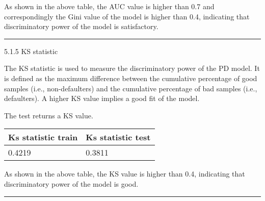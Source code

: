 As shown in the above table, the AUC value is higher than 0.7 and
correspondingly the Gini value of the model is higher than 0.4,
indicating that discriminatory power of the model is satisfactory.

\begin{center}\rule{0.5\linewidth}{\linethickness}\end{center}

5.1.5 KS statistic

The KS statistic is used to measure the discriminatory power of the PD
model. It is defined as the maximum difference between the cumulative
percentage of good samples (i.e., non-defaulters) and the cumulative
percentage of bad samples (i.e., defaulters). A higher KS value implies
a good fit of the model.

The test returns a KS value.

\begin{longtable}[]{@{}ll@{}}
\toprule
Ks statistic train & Ks statistic test\tabularnewline
\midrule
\endhead
0.4219 & 0.3811\tabularnewline
\bottomrule
\end{longtable}

As shown in the above table, the KS value is higher than 0.4, indicating
that discriminatory power of the model is good.

\begin{center}\rule{0.5\linewidth}{\linethickness}\end{center}
